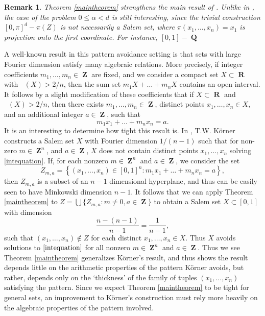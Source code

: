 \documentclass[12pt,reqno]{article}
\numberwithin{equation}{section}
\DeclareMathOperator{\fordim}{\dim_{\mathbf{F}}}
\DeclareMathOperator{\RR}{\mathbf{R}}
\DeclareMathOperator{\ZZ}{\mathbf{Z}}
\DeclareMathOperator{\QQ}{\mathbf{Q}}
\newtheorem{remark}{Remark}
\begin{document}
\begin{remark}
    Theorem \ref{maintheorem} strengthens the main result of \cite{OurPaper}. Unlike in \cite{OurPaper}, the case of the problem $0 \leq \alpha < d$ is still interesting, since the trivial construction $[0,\pi]^d - \pi(Z)$ is not necessarily a Salem set, where $\pi(x_1, \dots, x_n) = x_1$ is projection onto the first coordinate. For instance, $[0,1] - \QQ$
\end{remark}

A well-known result in this pattern avoidance setting is that sets with large Fourier dimension satisfy many algebraic relations. More precisely, if integer coefficients $m_1, \dots, m_n \in \ZZ$ are fixed, and we consider a compact set $X \subset \RR$ with $\fordim(X) > 2/n$, then the sum set $m_1 X + \dots + m_n X$ contains an open interval. It follows by a slight modification of these coefficients that if $X \subset \RR$ and $\fordim(X) > 2/n$, then there exists $m_1, \dots, m_n \in \ZZ$, distinct points $x_1, \dots, x_n \in X$, and an additional integer $a \in \ZZ$, such that
%
\begin{equation} \label{intequation}
    m_1 x_1 + \dots + m_n x_n = a.
\end{equation}
%
It is an interesting to determine how tight this result is. In \cite{Korner2}, T.W. K\"{o}rner constructs a Salem set $X$ with Fourier dimension $1/(n-1)$ such that for non-zero $m \in \ZZ^n$, and $a \in \ZZ$, $X$ does not contain distinct points $x_1, \dots, x_n$ solving \eqref{intequation}. If, for each nonzero $m \in \ZZ^n$ and $a \in \ZZ$, we consider the set
%
\[ Z_{m,a} = \left\{ (x_1, \dots, x_n) \in [0,1]^n : m_1x_1 + \dots + m_n x_n = a \right\}, \]
%
then $Z_{m,a}$ is a subset of an $n-1$ dimensional hyperplane, and thus can be easily seen to have Minkowski dimension $n-1$. It follows that we can apply Theorem \ref{maintheorem} to $Z = \bigcup \{ Z_{m,a} : m \neq 0, a \in \ZZ \}$ to obtain a Salem set $X \subset [0,1]$ with dimension
%
\[ \frac{n - (n-1)}{n - 1} = \frac{1}{n-1}, \]
%
such that $(x_1, \dots, x_n) \not \in Z$ for each distinct $x_1, \dots, x_n \in X$. Thus $X$ avoids solutions to $\eqref{intequation}$ for all nonzero $m \in \ZZ^n$ and $a \in \ZZ$. Thus we see Theorem \ref{maintheorem} generalizes K\"{o}rner's result, and thus shows the result depends little on the arithmetic properties of the pattern K\"{o}rner avoids, but rather, depends only on the `thickness' of the family of tuples $(x_1, \dots, x_n)$ satisfying the pattern. Since we expect Theorem \ref{maintheorem} to be tight for general sets, an improvement to K\"{o}rner's construction must rely more heavily on the algebraic properties of the pattern involved.
\end{document}
